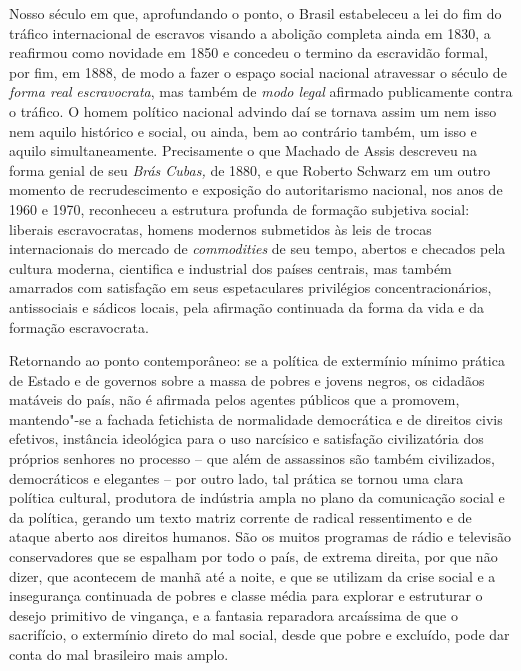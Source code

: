 Nosso século  em que, aprofundando o ponto, o Brasil estabeleceu a
lei do fim do tráfico internacional de escravos visando a abolição
completa ainda em 1830, a reafirmou como novidade em 1850 e concedeu o
termino da escravidão formal, por fim, em 1888, de modo a fazer o espaço
social nacional atravessar o século de \emph{forma real}
\emph{escravocrata}, mas também de \emph{modo legal} afirmado
publicamente contra o tráfico. O homem político nacional advindo daí se
tornava assim um nem isso nem aquilo histórico e social, ou ainda, bem
ao contrário também, um isso e aquilo simultaneamente. Precisamente o
que Machado de Assis descreveu na forma genial de seu \emph{Brás Cubas,}
de 1880, e que Roberto Schwarz em um outro momento de recrudescimento e
exposição do autoritarismo nacional, nos anos de 1960 e 1970, reconheceu
a estrutura profunda de formação subjetiva social: liberais
escravocratas, homens modernos submetidos às leis de trocas
internacionais do mercado de \emph{commodities} de seu tempo, abertos e
checados pela cultura moderna, cientifica e industrial dos países
centrais, mas também amarrados com satisfação em seus espetaculares
privilégios concentracionários, antissociais e sádicos locais, pela
afirmação continuada da forma da vida e da formação escravocrata.

Retornando ao ponto contemporâneo: se a política de extermínio mínimo
prática de Estado e de governos sobre a massa de pobres e jovens negros,
os cidadãos matáveis do país, não é afirmada pelos agentes públicos que
a promovem, mantendo"-se a fachada fetichista de normalidade democrática
e de direitos civis efetivos, instância ideológica para o uso narcísico
e satisfação civilizatória dos próprios senhores no processo -- que além
de assassinos são também civilizados, democráticos e elegantes -- por
outro lado, tal prática se tornou uma clara política cultural, produtora
de indústria ampla no plano da comunicação social e da política, gerando
um texto matriz corrente de radical ressentimento e de ataque aberto aos
direitos humanos. São os muitos programas de rádio e televisão
conservadores que se espalham por todo o país, de extrema direita, por
que não dizer, que acontecem de manhã até a noite, e que se utilizam da
crise social e a insegurança continuada de pobres e classe média para
explorar e estruturar o desejo primitivo de vingança, e a fantasia
reparadora arcaíssima de que o sacrifício, o extermínio direto do mal
social, desde que pobre e excluído, pode dar conta do mal brasileiro
mais amplo.

